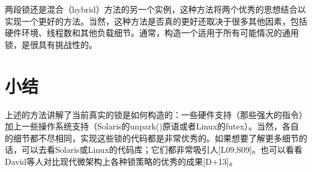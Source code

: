 两段锁还是混合（hybrid）方法的另一个实例，这种方法将两个优秀的思想结合以实现一个更好的方法。当然，这种方法是否真的更好还取决于很多其他因素，包括硬件环境、线程数和其他负载细节。通常，构造一个适用于所有可能情况的通用锁，是很具有挑战性的。


\section{小结}
上述的方法讲解了当前真实的锁是如何构造的：一些硬件支持（那些强大的指令）加上一些操作系统支持（Solaris的unpark()原语或者Linux的futex）。当然，各自的细节都不尽相同，实现这些锁的代码都是非常优秀的。如果想要了解更多细节的话，可以去看Solaris或Linux的代码库；它们都非常吸引人[L09,S09]。也可以看看David等人对比现代微架构上各种锁策略的优秀的成果[D+13]。









